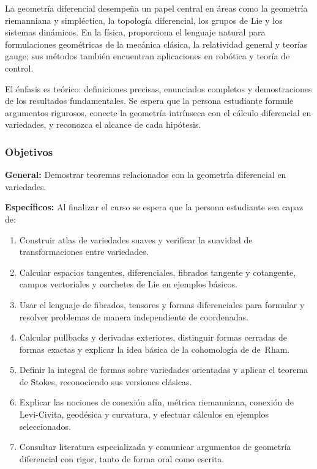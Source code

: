 \begin{refsection}
La geometría diferencial desempeña un papel central en áreas como la geometría riemanniana y simpléctica, la topología diferencial, los grupos de Lie y los sistemas dinámicos. En la física, proporciona el lenguaje natural para formulaciones geométricas de la mecánica clásica, la relatividad general y teorías gauge; sus métodos también encuentran aplicaciones en robótica y teoría de control.

El énfasis es teórico: definiciones precisas, enunciados completos y demostraciones de los resultados fundamentales. Se espera que la persona estudiante formule argumentos rigurosos, conecte la geometría intrínseca con el cálculo diferencial en variedades, y reconozca el alcance de cada hipótesis.

\subsubsection*{Objetivos}

\textbf{General:} Demostrar teoremas relacionados con la geometría diferencial en variedades.

\textbf{Específicos:} Al finalizar el curso se espera que la persona estudiante sea capaz de:

\begin{enumerate}
\item Construir atlas de variedades suaves y verificar la suavidad de transformaciones entre variedades.
\item Calcular espacios tangentes, diferenciales, fibrados tangente y cotangente, campos vectoriales y corchetes de Lie en ejemplos básicos.
\item Usar el lenguaje de fibrados, tensores y formas diferenciales para formular y resolver problemas de manera independiente de coordenadas.
\item Calcular pullbacks y derivadas exteriores, distinguir formas cerradas de formas exactas y explicar la idea básica de la cohomología de de~Rham.
\item Definir la integral de formas sobre variedades orientadas y aplicar el teorema de Stokes, reconociendo sus versiones clásicas.
\item Explicar las nociones de conexión afín, métrica riemanniana, conexión de Levi-Civita, geodésica y curvatura, y efectuar cálculos en ejemplos seleccionados.
\item Consultar literatura especializada y comunicar argumentos de geometría diferencial con rigor, tanto de forma oral como escrita.
\end{enumerate}


\end{refsection}
